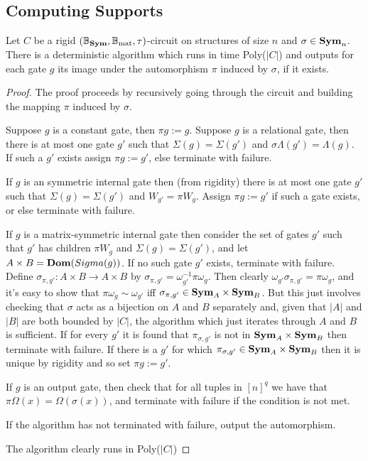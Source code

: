 \documentclass[../paper.tex]{subfiles}
\begin{document}
  

  \subsection{Computing Supports}
  
 \begin{lem}
   Let $C$ be a rigid $(\mathbb{B}_{\text{\textbf{Sym}}}, \mathbb{B}_{\text{mat}}, \tau)$-circuit on structures of size $n$ and
   $\sigma \in \text{\textbf{Sym}}_n$. There is a deterministic algorithm which runs in time
   Poly($\vert C \vert$) and outputs for each gate $g$ its image under the
   automorphism $\pi$ induced by $\sigma$, if it exists.
   \label{lem:computing-supports}
 \end{lem}
 \begin{proof}
   The proof proceeds by recursively going through the circuit and building the
   mapping $\pi$ induced by $\sigma$.

   Suppose $g$ is a constant gate, then $\pi g := g$. Suppose $g$ is a
   relational gate, then there is at most one gate $g'$ such that $\Sigma (g) =
   \Sigma (g')$ and $\sigma\Lambda (g') = \Lambda (g)$. If such a $g'$ exists
   assign $\pi g := g'$, else terminate with failure.

   If $g$ is an symmetric internal gate then (from rigidity) there is at most
   one gate $g'$ such that $\Sigma (g) = \Sigma(g')$ and $W_{g'} = \pi W_g$.
   Assign $\pi g := g'$ if such a gate exists, or else terminate with failure.

   If $g$ is a matrix-symmetric internal gate then consider the set of gates
   $g'$ such that $g'$ has children $\pi W_g$ and $\Sigma(g) = \Sigma(g')$, and
   let $A \times B = \text{\textbf{Dom}} (Sigma(g))$. If no such gate $g'$ exists, terminate
   with failure. Define $\sigma_{\pi, g'}:A \times B \rightarrow A \times B$ by
   $\sigma_{\pi, g'} = \omega^{-1}_{g'} \pi \omega_{g}$. Then clearly
   $\omega_{g'} \sigma_{\pi, g'} = \pi \omega_{g}$, and it's easy to show that
   $\pi \omega_g \sim \omega_{g'}$ iff $\sigma_{\pi,g'} \in \text{\textbf{Sym}}_A \times
   \text{\textbf{Sym}}_B$. But this just involves checking that $\sigma$ acts as a bijection on
   $A$ and $B$ separately and, given that $\vert A \vert$ and $\vert B \vert$
   are both bounded by $\vert C \vert$, the algorithm which just iterates
   through $A$ and $B$ is sufficient. If for every $g'$ it is found that
   $\pi_{\sigma,g'}$ is not in $\text{\textbf{Sym}}_A \times \text{\textbf{Sym}}_B$ then terminate with
   failure. If there is a $g'$ for which $\pi_{\sigma, g'} \in \text{\textbf{Sym}}_A \times
   \text{\textbf{Sym}}_B$ then it is unique by rigidity and so set $\pi g := g'$.

   If $g$ is an output gate, then check that for all tuples in $[n]^{q}$ we have
   that $\pi \Omega (x) = \Omega (\sigma (x))$, and terminate with failure if
   the condition is not met.

   If the algorithm has not terminated with failure, output the automorphism.

   The algorithm clearly runs in Poly($\vert C \vert$)
 \end{proof}
\end{document}
